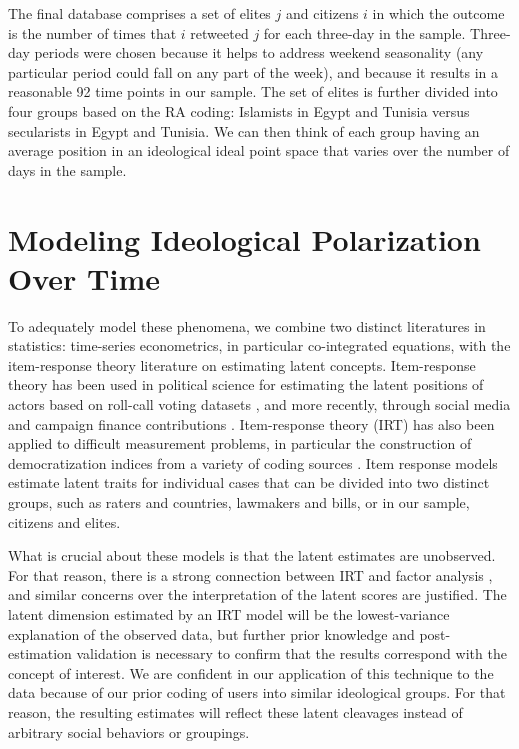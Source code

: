 \documentclass[12pt]{article}
\begin{document}
The final database comprises a set of elites $j$ and citizens $i$ in which the outcome is the number of times that $i$ retweeted $j$ for each three-day in the sample. Three-day periods were chosen because it helps to address weekend seasonality (any particular period could fall on any part of the week), and because it results in a reasonable 92 time points in our sample. The set of elites is further divided into four groups based on the RA coding: Islamists in Egypt and Tunisia versus secularists in Egypt and Tunisia. We can then think of each group having an average position in an ideological ideal point space that varies over the number of days in the sample. 

\section*{Modeling Ideological Polarization Over Time}
To adequately model these phenomena, we combine two distinct literatures in statistics: time-series econometrics, in particular co-integrated equations, with the item-response theory literature on estimating latent concepts. Item-response theory has been used in political science for estimating the latent positions of actors based on roll-call voting datasets \parencite{jackman2004}, and more recently, through social media and campaign finance contributions \parencite{bonica2014,barbera2015}. Item-response theory (IRT) has also been applied to difficult measurement problems, in particular the construction of democratization indices from a variety of coding sources \parencite{vdem2017,treier2008}. Item response models estimate latent traits for individual cases that can be divided into two distinct groups, such as raters and countries, lawmakers and bills, or in our sample, citizens and elites. 

What is crucial about these models is that the latent estimates are unobserved. For that reason, there is a strong connection between IRT and factor analysis \parencite{takane1986}, and similar concerns over the interpretation of the latent scores are justified. The latent dimension estimated by an IRT model will be the lowest-variance explanation of the observed data, but further prior knowledge and post-estimation validation is necessary to confirm that the results correspond with the concept of interest. We are confident in our application of this technique to the data because of our prior coding of users into similar ideological groups. For that reason, the resulting estimates will reflect these latent cleavages instead of arbitrary social behaviors or groupings.
\end{document}

